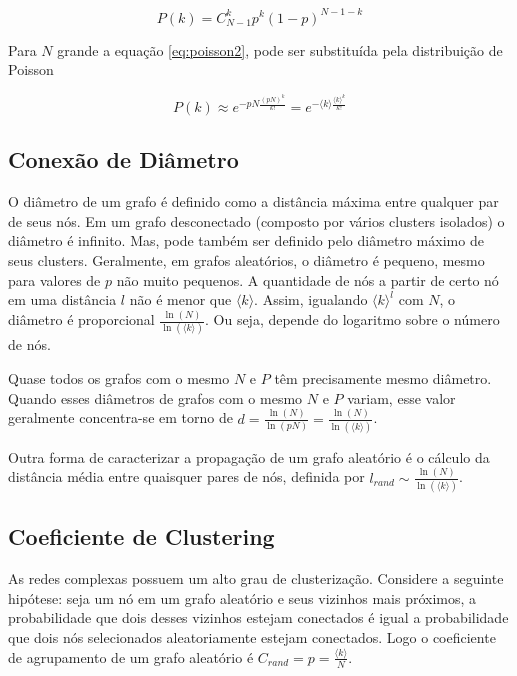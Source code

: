 \documentclass[brazil,ruledheader]{abnt}
\begin{document}
\begin{equation}
\label{eq:poisson2}
P(k)=C_{N-1}^kp^k(1-p)^{N-1-k}
\end{equation}

Para $N$ grande a equação \ref{eq:poisson2}, pode ser substituída pela
distribuição de Poisson

\begin{equation}
\label{eq:distribuicao-poisson}
P(k)\approx e^{-pN\frac{(pN)^k}{k!}}=e^{-\langle k \rangle \frac{\langle
k\rangle^k}{k!}}
\end{equation}

\subsection{Conexão de Diâmetro}

O diâmetro de um grafo é definido como a distância máxima entre qualquer par de
seus nós. Em um grafo desconectado (composto por vários clusters isolados) o
diâmetro é infinito. Mas, pode também ser definido pelo diâmetro máximo de seus
clusters. Geralmente, em grafos aleatórios, o diâmetro é pequeno, mesmo para
valores de $p$ não muito pequenos. A quantidade de nós
a partir de certo nó em uma distância $l$  não é menor que $\langle k\rangle$.
Assim, igualando
$\langle k\rangle^l$ com $N$, o diâmetro é proporcional
$\frac{\ln(N)}{\ln(\langle k \rangle)}$. Ou seja, depende do logaritmo sobre o
número de nós.

Quase todos os grafos com o mesmo $N$ e $P$ têm
precisamente mesmo diâmetro. Quando esses diâmetros de grafos com o mesmo $N$ e
$P$ variam, esse valor geralmente concentra-se em torno de
$d=\frac{\ln(N)}{\ln(pN)}=\frac{\ln(N)}{\ln(\langle k \rangle)}$.

Outra forma de caracterizar a propagação de um grafo aleatório é o cálculo da
distância média entre quaisquer pares de nós, definida por $l_{rand}\sim
\frac{\ln(N)}{\ln(\langle k \rangle)}$.

\subsection{Coeficiente de Clustering}

As redes complexas possuem um alto grau de clusterização. Considere a seguinte
hipótese: seja um nó em um grafo aleatório e seus vizinhos mais próximos, a
probabilidade que dois desses vizinhos estejam conectados é igual a
probabilidade que dois nós selecionados aleatoria\-mente estejam conectados.
Logo o coeficiente de agrupamento de um grafo aleatório é
$C_{rand}=p=\frac{\langle k \rangle}{N}$.
\end{document}
